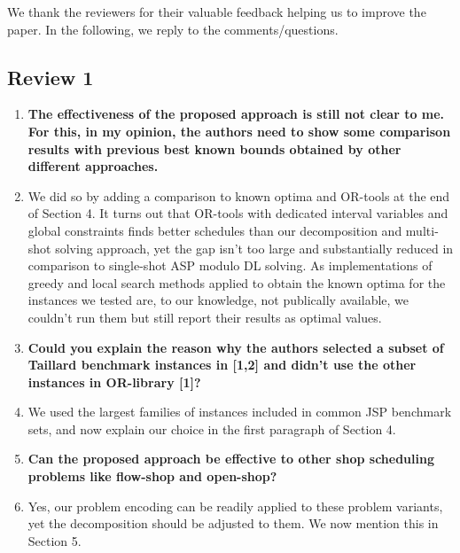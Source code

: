 \documentclass[11pt]{article}
\begin{document}
We thank the reviewers for their valuable feedback helping us to improve the paper. In the following, we reply to the comments/questions. %

\subsection*{Review 1}
\begin{enumerate}[wide, labelwidth=!, labelindent=0pt]
\item \textbf{The effectiveness of the proposed approach is still not clear to me.
      For this, in my opinion, the authors need to show some comparison
	  results with previous best known bounds obtained by other different
	  approaches.}
\item[] We did so by adding a comparison to known optima and OR-tools at the end of Section 4.
        It turns out that OR-tools with dedicated interval variables and global constraints
		finds better schedules than our decomposition and multi-shot solving
		approach, yet the gap isn't too large and substantially reduced in comparison to
		single-shot ASP modulo DL solving.
		As implementations of greedy and local search methods applied to obtain the known
		optima for the instances we tested are, to our knowledge, not publically available,
		we couldn't run them but still report their results as optimal values.
\item \textbf{Could you explain the reason why the authors selected a subset of
       Taillard benchmark instances in [1,2] and didn't use the other
       instances in OR-library [1]?}
\item[] We used the largest families of instances included in common JSP benchmark sets,
        and now explain our choice in the first paragraph of Section 4.
\item \textbf{Can the proposed approach be effective to other shop scheduling
problems like flow-shop and open-shop?}
\item[] Yes, our problem encoding can be readily applied to these problem variants,
        yet the decomposition should be adjusted to them.
		We now mention this in Section 5.
\end{enumerate}
\end{document}
